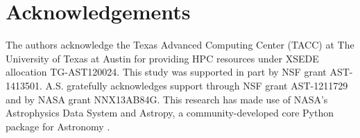 \documentclass[usenatbib]{mn2e}
\begin{document}
\section*{Acknowledgements}
The authors acknowledge the Texas Advanced Computing Center (TACC) at The University of Texas at Austin for providing HPC resources under XSEDE allocation TG-AST120024. This study was supported in part by NSF grant AST-1413501. A.S. gratefully acknowledges support through NSF grant AST-1211729 and by NASA grant NNX13AB84G. This research has made use of NASA's Astrophysics Data System and Astropy, a community-developed core Python package for Astronomy \citep{Robitailleetal2013}.


\end{document}
